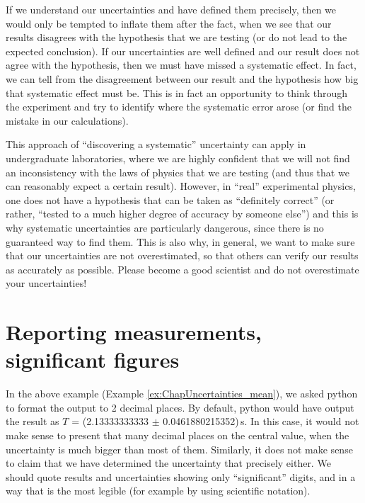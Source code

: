 If we understand our uncertainties and have defined them precisely, then we would only be tempted to inflate them after the fact, when we see that our results disagrees with the hypothesis that we are testing (or do not lead to the expected conclusion). If our uncertainties are well defined and our result does not agree with the hypothesis, then we must have missed a systematic effect. In fact, we can tell from the disagreement between our result and the hypothesis how big that systematic effect must be. This is in fact an opportunity to think through the experiment and try to identify where the systematic error arose (or find the mistake in our calculations).

This approach of ``discovering a systematic'' uncertainty can apply in undergraduate laboratories, where we are highly confident that we will not find an inconsistency with the laws of physics that we are testing (and thus that we can reasonably expect a certain result). However, in ``real'' experimental physics, one does not have a hypothesis that can be taken as ``definitely correct'' (or rather, ``tested to a much higher degree of accuracy by someone else'') and this is why systematic uncertainties are particularly dangerous, since there is no guaranteed way to find them. This is also why, in general, we want to make sure that our uncertainties are not overestimated, so that others can verify our results as accurately as possible. Please become a good scientist and do not overestimate your uncertainties!


\section{Reporting measurements, significant figures}
In the above example (Example \ref{ex:ChapUncertainties_mean}), we asked python to format the output to 2 decimal places. By default, python would have output the result as $T$ = (2.13333333333 $\pm$ 0.0461880215352)\,s. In this case, it would not make sense to present that many decimal places on the central value, when the uncertainty is much bigger than most of them. Similarly, it does not make sense to claim that we have determined the uncertainty that precisely either. We should quote results and uncertainties showing only ``significant'' digits, and in a way that is the most legible (for example by using scientific notation).

